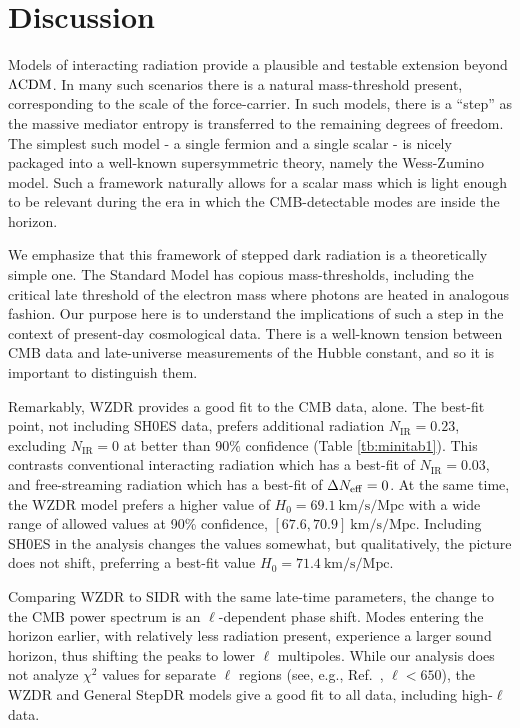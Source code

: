 \documentclass[aps,prd,twocolumn,nofootinbib,superscriptaddress]{revtex4}
\newcommand{\ksm}{\text{km} / \text{s} / \text{Mpc}}
\newcommand{\nir}{N_\text{IR}}
\def\lcdm{$\Lambda{\rm CDM}$}
\newcommand{\Neff}{N_{\rm eff}}
\begin{document}
\section{Discussion}
\label{sec:conclusion}
Models of interacting radiation provide a plausible and testable extension beyond \lcdm. In many such scenarios there is a natural mass-threshold present, corresponding to the scale of the force-carrier. In such models, there is a ``step'' as the massive mediator entropy is transferred to the remaining degrees of freedom. The simplest such model - a single fermion and a single scalar - is nicely packaged into a well-known supersymmetric theory, namely the Wess-Zumino model. Such a framework naturally allows for a scalar mass which is light enough to be relevant during the era in which the CMB-detectable modes are inside the horizon.

We emphasize that this framework of stepped dark radiation is a theoretically simple one. The Standard Model has copious mass-thresholds, including the critical late threshold of the electron mass where photons are heated in analogous fashion. Our purpose here is to understand the implications of such a step in the context of present-day cosmological data. There is a well-known tension between CMB data and late-universe measurements of the Hubble constant, and so it is important to distinguish them.

Remarkably, WZDR provides a good fit to the CMB data, alone. The best-fit point, not including SH0ES data, prefers additional radiation $\nir = 0.23$, excluding $\nir=0$ at better than 90\% confidence (Table \ref{tb:minitab1}). This contrasts conventional interacting radiation which has a best-fit of $\nir=0.03$, and free-streaming radiation which has a best-fit of $\Delta \Neff = 0$. At the same time, the WZDR model prefers a higher value of $H_0 = 69.1 \ \ksm$ with a wide range of allowed values at 90\% confidence, $[67.6,70.9] \ \ksm$. Including SH0ES in the analysis changes the values somewhat, but qualitatively, the picture does not shift, preferring a best-fit value $H_0 = 71.4  \ \ksm$. 

Comparing WZDR to SIDR with the same late-time parameters, the change to the CMB power spectrum is an $\ell$-dependent phase shift.
Modes entering the horizon earlier, with relatively less radiation present, experience a larger sound horizon, thus shifting the peaks to lower $\ell$ multipoles. While our analysis does not analyze $\chi^2$ values for separate $\ell$ regions (see, e.g., Ref.~\cite{Hill:2021yec}, $\ell < 650$), the WZDR and General StepDR models give a good fit to all data, including high-$\ell$ data.
\end{document}
